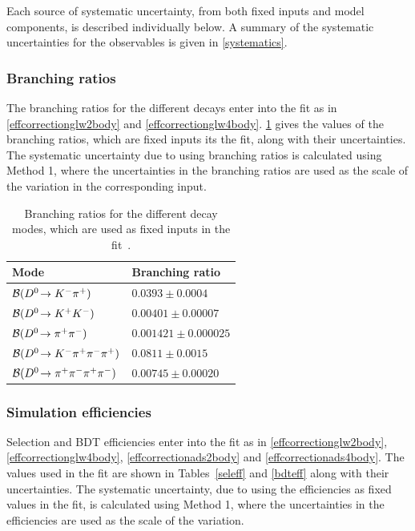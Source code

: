 Each source of systematic uncertainty, from both fixed inputs and model components, is described individually below. A summary of the systematic uncertainties for the \CP observables is given in \tab\ref{systematics}.

\subsubsection{Branching ratios}

The branching ratios for the different \Dz decays enter into the \CP fit as in \eqns\ref{effcorrectionglw2body} and \ref{effcorrectionglw4body}. \Tab\ref{BR} gives the values of the branching ratios, which are fixed inputs its the \CP fit, along with their uncertainties. The systematic uncertainty due to using branching ratios is calculated using Method 1, where the uncertainties in the branching ratios are used as the scale of the variation in the corresponding input.

\begin{table}
\centering
\begin{tabular}{l|l}
\hline
Mode & Branching ratio \\
\hline
$\mathcal{B}({{D}^0}\!\rightarrow {\ensuremath{{K}^-}}{\ensuremath{{\pi}^+}})$ & $0.0393 \pm 0.0004$ \\
$\mathcal{B}({{D}^0}\!\rightarrow {\ensuremath{{K}^+}}{\ensuremath{{K}^-}})$ & $0.00401 \pm 0.00007$ \\
$\mathcal{B}({{D}^0}\!\rightarrow {\ensuremath{{\pi}^+}}{\ensuremath{{\pi}^-}})$ & $0.001421 \pm 0.000025$ \\
$\mathcal{B}({{D}^0}\!\rightarrow {\ensuremath{{K}^-}}{\ensuremath{{\pi}^+}}{\ensuremath{{\pi}^-}}{\ensuremath{{\pi}^+}})$ & $0.0811 \pm 0.0015$ \\
$\mathcal{B}({{D}^0}\!\rightarrow {\ensuremath{{\pi}^+}}{\ensuremath{{\pi}^-}}{\ensuremath{{\pi}^+}}{\ensuremath{{\pi}^-}})$ & $0.00745 \pm 0.00020$ \\
\hline
\end{tabular}
\caption{Branching ratios for the different \Dz decay modes, which are used as fixed inputs in the \CP fit~\cite{PDG2014}.}
\label{BR}
\end{table}

\subsubsection{Simulation efficiencies}

Selection and BDT efficiencies enter into the \CP fit as in \eqns\ref{effcorrectionglw2body}, \ref{effcorrectionglw4body}, \ref{effcorrectionads2body} and \ref{effcorrectionads4body}. The values used in the \CP fit are shown in Tables~\ref{seleff} and \ref{bdteff} along with their uncertainties. The systematic uncertainty, due to using the efficiencies as fixed values in the \CP fit, is calculated using Method 1, where the uncertainties in the efficiencies are used as the scale of the variation.

